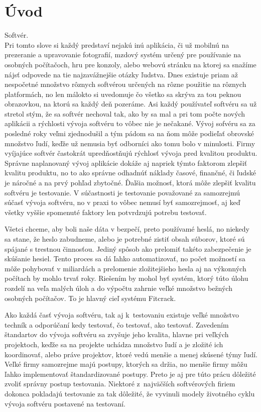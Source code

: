 \chapter{Úvod}
Softvér. \\
Pri tomto slove si každý predstaví nejakú inú aplikácia, či už mobilnú na prezeranie a upravovanie fotografií, mzdový systém určený pre používanie na osobných počítačoch, hru pre konzoly, alebo webovú stránku na ktorej sa snažíme nájsť odpovede na tie najzavážnejšie otázky ľudstva.
Dnes existuje priam až nespočetné množstvo rôznych softvérou určených na rôzne použitie na rôznych platformách, no len málokto si uvedomuje čo všetko sa skrýva za tou peknou obrazovkou, na ktorú sa každý deň pozeráme.
Asi každý používateľ softvéru sa už stretol stým, že sa softvér nechoval tak, ako by sa mal a pri tom počte nových aplikácii a rýchlosti vývoja softvéru to vôbec nie je nečakané. 
Vývoj sofvéru sa za posledné roky veľmi zjednodušil a tým pádom sa na ňom môže podieľať obrovské množstvo ľudí, keďže už nemusia byť odborníci ako tomu bolo v minulosti.
Firmy vyíjajúce softvér častokrát upredňostňujú rýchlosť vývoja pred kvalitou produktu.
Správne naplanovaný vývoj aplikácie dokáže aj napriek týmto faktorom zlepšiť kvalitu produktu, no to ako správne odhadnúť náklady časové, finančné, či ľudské je náročné a na prvý pohľad zbytočné.
Ďalšia možnosť, ktorá môže zlepšiť kvalitu softvéru je testovanie.
V súčastnosti je testovanie považované za samozrejmú súčasť vývoja softvéru, no v praxi to vôbec nemusí byť samozrejmosť, aj keď všetky vyššie spomenuté faktory len potvrdzujú potrebu testovať.

Všetci chceme, aby boli naše dáta v bezpečí, preto používamé heslá, no niekedy sa stane, že heslo zabudneme, alebo je potrebné zistiť obsah súborov, ktoré sú spájané s trestnou činnosťou.
Jediný spôsob ako prelomiť takéto zabezpečenie je skúšanie hesiel.
Tento proces sa dá ľahko automatizovať, no počet možností sa môže pohybovať v miliardách a prelomenie zložitejšieho hesla aj na výkonných počítach by mohlo trvať roky.
Riešením by mohol byť systém, ktorý túto úlohu rozdelí na veľa malých úloh a do výpočtu zahrnie veľké množstvo bežných osobných počítačov.
To je hlavný cieľ systému Fitcrack.

Ako každá časť vývoja softvéru, tak aj k~testovaniu existuje veľké množstvo techník a odporúčaní kedy testovať, čo testovať, ako testovať.
Zavedením štandartov do vývoja softvéru sa zvyšuje jeho kvalita, hlavne pri veľkých projektoch, keďže sa na projekte uchádza množstvo ľudí a je zložité ich koordinovať, alebo práve projektov, ktoré vedú menšie a menej skúsené týmy ľudí.
Veľké firmy samozrejme majú postupy, ktorých sa držia, no menšie firmy môžu ľahko implementovať štandardizované postupy.
Preto je aj pre túto prácu dôležité zvoliť správny postup testovania.
Niektoré z~najväčších softvérových firiem dokonca pokladajú testovanie za tak dôležité, že vyvinuli modely životného cyklu vývoja softvéru postavené na testovaní.

